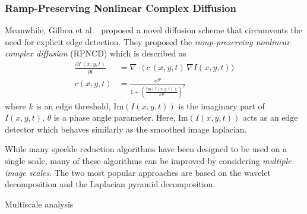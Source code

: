 \subsubsection{Ramp-Preserving Nonlinear Complex Diffusion}
Meanwhile, Gilboa et al.~\cite{gilboa_image_2004} proposed a novel diffusion scheme that circumvents the need for explicit edge detection.
They proposed the \textit{ramp-preserving nonlinear complex diffusion} (RPNCD) which is described as
\begin{align}
  \frac{\partial  I\,(x, y, t)}{\partial t} &= \nabla \cdot \big(\, c\,(x, y, t) \, \nabla I(x, y, t) \big) \\
  c\left(x, y, t\right) &= \frac{e^{j \theta}}{ 1 + {\left( \frac{\mathrm{Im}\left(I(x, y, t)\right)}{ k \, \theta } \right)}^2}
\end{align}
where \(k\) is an edge threshold, \(\mathrm{Im}\left(I(x, y, t)\right)\) is the imaginary part of \(I(x,y,t)\), \(\theta\) is a phase angle parameter.
Here, \(\mathrm{Im}\left(I(x, y, t)\right)\) acts as an edge detector which behaves similarly as the smoothed image laplacian.


While many speckle reduction algorithms have been designed to be used on a single scale, many of these algorithms can be improved by considering \textit{multiple image scales}.
The two most popular approaches are based on the wavelet decomposition and the Laplacian pyramid decomposition.

Multiscale analysis 

